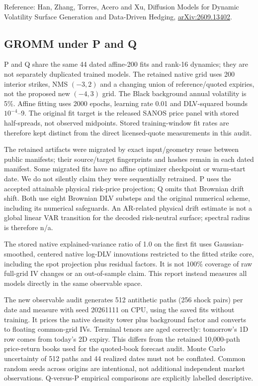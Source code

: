 \documentclass[11pt]{article}
\begin{document}
Reference: Han, Zhang, Torres, Acero and Xu, Diffusion Models for Dynamic Volatility Surface Generation and Data-Driven Hedging, \href{https://arxiv.org/abs/2609.13402}{arXiv:2609.13402}.

\subsection{GROMM under P and Q}

P and Q share the same 44 dated affine-200 fits and rank-16 dynamics; they are not separately duplicated trained models. The retained native grid uses 200 interior strikes, NMS $(-3,2)$ and a changing union of reference/quoted expiries, not the proposed new $(-4,3)$ grid. The Black background annual volatility is 5\%. Affine fitting uses 2000 epochs, learning rate 0.01 and DLV-squared bounds $10^{-4}$--9. The original fit target is the released SANOS price panel with stored half-spreads, not observed midpoints. Stored training-window fit rates are therefore kept distinct from the direct licensed-quote measurements in this audit.

The retained artifacts were migrated by exact input/geometry reuse between public manifests; their source/target fingerprints and hashes remain in each dated manifest. Some migrated fits have no affine optimizer checkpoint or warm-start date. We do not silently claim they were sequentially retrained. P uses the accepted attainable physical risk-price projection; Q omits that Brownian drift shift. Both use eight Brownian DLV substeps and the original numerical scheme, including its numerical safeguards. An AR-related physical drift estimate is not a global linear VAR transition for the decoded risk-neutral surface; spectral radius is therefore n/a.

The stored native explained-variance ratio of 1.0 on the first fit uses Gaussian-smoothed, centered native log-DLV innovations restricted to the fitted strike core, including the spot projection plus residual factors. It is not 100\% coverage of raw full-grid IV changes or an out-of-sample claim. This report instead measures all models directly in the same observable space.

The new observable audit generates 512 antithetic paths (256 shock pairs) per date and measure with seed 20261111 on CPU, using the saved fits without training. It prices the native density tower plus background factor and converts to floating common-grid IVs. Terminal tenors are aged correctly: tomorrow's 1D row comes from today's 2D expiry. This differs from the retained 10,000-path price-return books used for the quoted-book forecast audit. Monte Carlo uncertainty of 512 paths and 44 realized dates must not be conflated. Common random seeds across origins are intentional, not additional independent market observations. Q-versus-P empirical comparisons are explicitly labelled descriptive.
\end{document}
